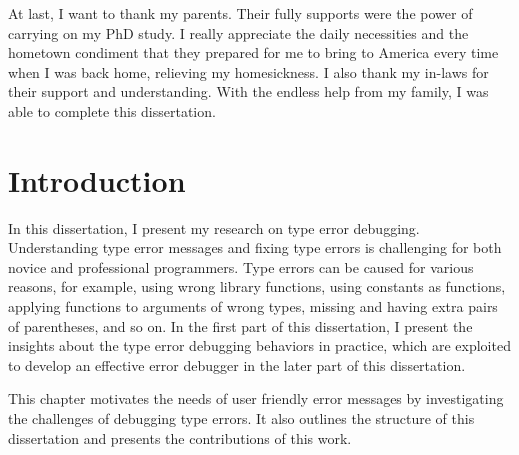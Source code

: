 \documentclass[12pt]{report}	%
\begin{document}
\begin{acknowledgments}
At last, I want to thank my parents.
Their fully supports were the power of carrying on my PhD study.
I really appreciate the daily necessities and the hometown condiment
that they prepared for me to bring to America every time when I was back home,
relieving my homesickness.
I also thank my in-laws for their support and understanding.
With the endless help from my family, I was able to complete this dissertation.


\end{acknowledgments}

\tableofcontents   
\listoffigures     

%
%
%
%

\chapter{Introduction}

In this dissertation, I present my research on type error debugging.
Understanding type error messages and fixing type errors is challenging for both novice and professional programmers.
Type errors can be caused for various reasons, for example, 
using wrong library functions,
using constants as functions, 
applying functions to arguments of wrong types, 
missing and having extra pairs of parentheses, and so on. 
In the first part of this dissertation, I present the insights about the type error debugging behaviors in practice, 
which are exploited to develop an effective error debugger in the later part of this dissertation.

This chapter motivates the needs of user friendly error messages
by investigating the challenges of debugging type errors.
It also outlines the structure of this dissertation and presents the contributions of this work.
\end{document}
